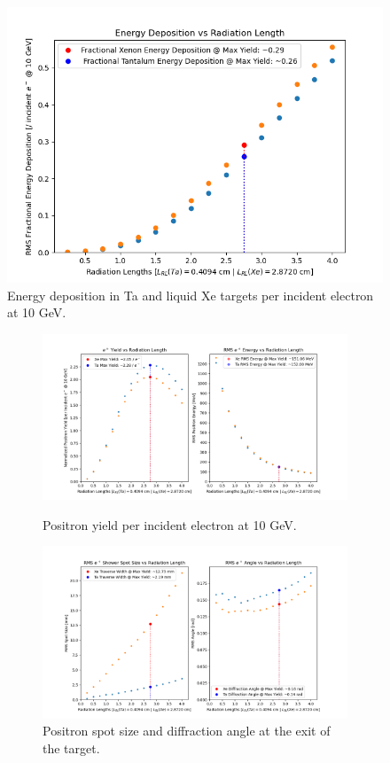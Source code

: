 \documentclass[%
reprint,
amsmath, amssymb,
aps,
floatfix,
]{revtex4-2}
\begin{document}
\begin{figure}[h]
    \includegraphics[width = \linewidth]{../images/CompDeps.png}
    \caption{\label{fig:EDep}Energy deposition in Ta and liquid Xe targets per incident electron at 10 GeV.}
\end{figure}

\begin{figure}[H]
    \begin{subfigure}{.5\textwidth}
        \includegraphics[height = .5\linewidth]{../images/CompYield.png}
        \caption{\label{fig:Yield} Positron yield per incident electron at 10 GeV.}
        \includegraphics[height = .5\linewidth]{../images/CompATW.png}
        \caption{\label{fig:ATW}Positron spot size and diffraction angle at the exit of the target.}
    \end{subfigure}
    \caption{\label{fig:Comps}}
\end{figure}
\end{document}
